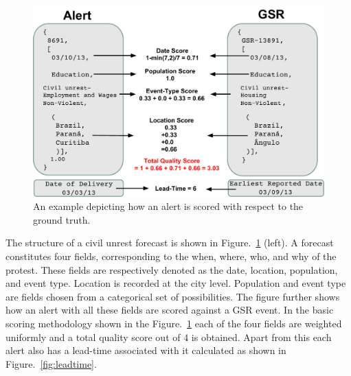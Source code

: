 \begin{figure}
\includegraphics[width=\columnwidth]{figures/cu/alert_vs_gsr.pdf}
\caption{An example depicting how an alert is scored with respect to the ground truth.}
\label{fig:alert}
\end{figure}
The structure of a civil unrest forecast is shown in
Figure.~\ref{fig:alert} (left).
A forecast constitutes four fields, corresponding to the when, where, who, and why
of the protest. These fields are respectively denoted as the date, location, population, and event type.
Location is recorded at the city level. Population and event type are fields chosen from a categorical
set of possibilities.  The figure further shows how an alert with all
these fields are scored against a GSR event. In the basic scoring
methodology shown in the Figure.~\ref{fig:alert} each of the four fields
are weighted uniformly and a total quality score out of 4 is
obtained.  Apart from this each alert also has a lead-time associated with
it calculated as shown in Figure.~\ref{fig:leadtime}.

